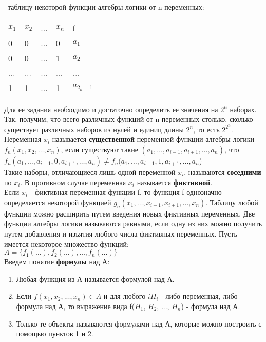 \faEye \ таблицу некоторой функции алгебры логики от n переменных:

\begin{tabular}{ l l l l l }
$x_{1}$ & $x_{2}$ & ... & $x_{n}$ & f \\
0 & 0 & ... & 0 & $a_{1}$ \\
0 & 0 & ... & 1 & $a_{2}$\\
... & ... & ... & ... & ...\\
1 & 1 & ... & 1 & $a_{2_{n} - 1}$\\
\end{tabular}

Для ее задания необходимо и достаточно определить ее значения на $2^{n}$ наборах. Так, получим, что всего различных функций от n переменных столько, сколько существует различных наборов из нулей и единиц длины $2^{n}$, то есть $2^{2^{n}}$. \\

Переменная $x_{i}$ называется \textbf{существенной} переменной функции алгебры логики $f_{n} (x_{1}, x_{2}, \ldots, x_{n})$, если существуют такие $(a_{1}, \ldots,a_{i-1}, a_{i+1}, \ldots, a_{n})$, что \\
    $f_{n} (a_{1},\ldots,a_{i-1}, 0, a_{i+1}, \ldots, a_{n}) \neq f_{n} (a_{1},\ldots ,a_{i-1}, 1, a_{i+1}, \ldots, a_{n}$) \\
Такие наборы, отличающиеся лишь одной переменной $x_{i}$, называются \textbf{соседними} по $x_{i}$. В противном случае переменная $x_{i}$ называется \textbf{фиктивной}. \\
Если $x_{i}$ - фиктивная переменная функции f, то функция f однозначно определяется некоторой функцией $g_{n} (x_{1}, \ldots ,x_{i-1}, x_{i+1}, \ldots, x_{n})$. Таблицу любой функции можно расширить путем введения новых фиктивных переменных. 
Две функции алгебры логики называются равными, если одну из них можно получить путем добавления и изъятия любого числа фиктивных переменных. 
Пусть имеется некоторое множество функций: \\
$A = \{f_{1}(\ldots), f_{2}(\ldots), \ldots, f_{n}(\ldots)\}$\\
Введем понятие \textbf{формулы} над А: 
\begin{enumerate}
    \item Любая функция из А называется формулой над А. 
    \item Если $f(x_{1}, x_{2}, ..., x_{n}) \in A$ и для любого $i H_{i}$ - либо переменная, либо формула над А, то выражение вида f($H_{1}$, $H_{2}$, ..., $H_{n}$) - формула над А. 
    \item Только те объекты называются формулами над А, которые можно построить с помощью пунктов 1 и 2. 
\end{enumerate}

